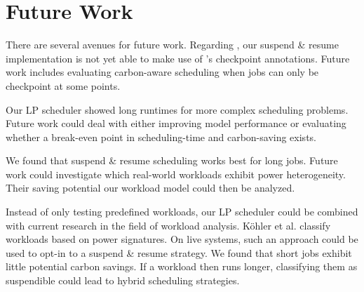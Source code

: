 \section{Future Work} \label{sec:future_work}

There are several avenues for future work.
Regarding \programname{}, our suspend \& resume implementation is not yet able to make use of \modelname{}'s checkpoint annotations. Future work includes evaluating carbon-aware scheduling when jobs can only be checkpoint at some points.

Our LP scheduler showed long runtimes for more complex scheduling problems.
Future work could deal with either improving model performance  or evaluating whether a break-even point in scheduling-time and carbon-saving exists.

We found that suspend \& resume scheduling works best for long jobs.
Future work could investigate which real-world workloads exhibit power heterogeneity.
Their saving potential our workload model could then be analyzed.

Instead of only testing predefined workloads, our LP scheduler could be combined with current research in the field of workload analysis. 
Köhler et al. \cite{kohler_recognizing_2021} classify workloads based on power signatures. 
On live systems, such an approach could be used to opt-in to a suspend \& resume strategy. 
We found that short jobs exhibit little potential carbon savings. 
If a workload then runs longer, classifying them as suspendible could lead to hybrid scheduling strategies.  
